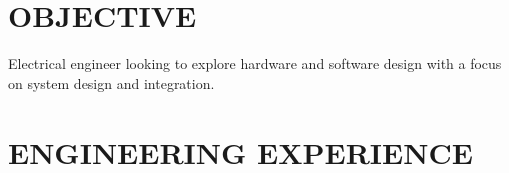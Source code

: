 \documentclass[line,margin]{res}
\begin{document}
\address{13336 Tobiasson Rd, Poway, CA 92064}
\address{nthui@ucsd.edu, (408) 838-5393}


\begin{resume}

\section{OBJECTIVE}
	Electrical engineer looking to explore hardware and software design with a focus on system design and integration.


\section{ENGINEERING EXPERIENCE}


\end{resume}
\end{document}

